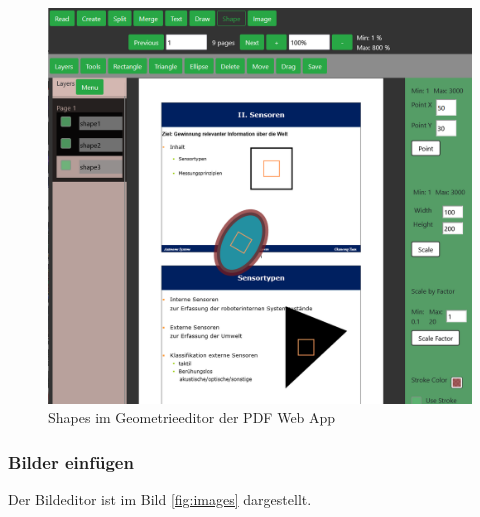 \begin{figure}[!htbp]
	\centering
	\includegraphics[width=1\textwidth]{"images/shaping.png"}
	\caption{Shapes im Geometrieeditor der PDF Web App}
	\label{fig:shaping}
\end{figure}


\subsubsection{Bilder einfügen}
Der Bildeditor ist im Bild \ref{fig:images} dargestellt. 

